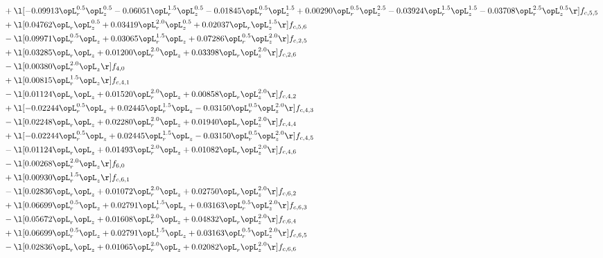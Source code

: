 \begin{alignat}{2}
& + \l[  -0.09913 \opL_r^{0.5} \opL_z^{0.5}   -0.06051 \opL_r^{1.5} \opL_z^{0.5}   -0.01845 \opL_r^{0.5} \opL_z^{1.5} +  0.00290 \opL_r^{0.5} \opL_z^{2.5}   -0.03924 \opL_r^{1.5} \opL_z^{1.5}   -0.03708 \opL_r^{2.5} \opL_z^{0.5}  \r] f_{c,5,5} \nonumber \\ 
& + \l[  0.04762 \opL_r \opL_z^{0.5} +  0.03419 \opL_r^{2.0} \opL_z^{0.5} +  0.02037 \opL_r \opL_z^{1.5}  \r] f_{c,5,6} \nonumber \\ 
& - \l[  0.09971 \opL_r^{0.5} \opL_z +  0.03065 \opL_r^{1.5} \opL_z +  0.07286 \opL_r^{0.5} \opL_z^{2.0}  \r] f_{c,2,5} \nonumber \\ 
& + \l[  0.03285 \opL_r \opL_z +  0.01200 \opL_r^{2.0} \opL_z +  0.03398 \opL_r \opL_z^{2.0}  \r] f_{c,2,6} \nonumber \\ 
& - \l[  0.00380 \opL_r^{2.0} \opL_z  \r] f_{4,0} \nonumber \\ 
& + \l[  0.00815 \opL_r^{1.5} \opL_z  \r] f_{c,4,1} \nonumber \\ 
& - \l[  0.01124 \opL_r \opL_z +  0.01520 \opL_r^{2.0} \opL_z +  0.00858 \opL_r \opL_z^{2.0}  \r] f_{c,4,2} \nonumber \\ 
& + \l[  -0.02244 \opL_r^{0.5} \opL_z +  0.02445 \opL_r^{1.5} \opL_z   -0.03150 \opL_r^{0.5} \opL_z^{2.0}  \r] f_{c,4,3} \nonumber \\ 
& - \l[  0.02248 \opL_r \opL_z +  0.02280 \opL_r^{2.0} \opL_z +  0.01940 \opL_r \opL_z^{2.0}  \r] f_{c,4,4} \nonumber \\ 
& + \l[  -0.02244 \opL_r^{0.5} \opL_z +  0.02445 \opL_r^{1.5} \opL_z   -0.03150 \opL_r^{0.5} \opL_z^{2.0}  \r] f_{c,4,5} \nonumber \\ 
& - \l[  0.01124 \opL_r \opL_z +  0.01493 \opL_r^{2.0} \opL_z +  0.01082 \opL_r \opL_z^{2.0}  \r] f_{c,4,6} \nonumber \\ 
& - \l[  0.00268 \opL_r^{2.0} \opL_z  \r] f_{6,0} \nonumber \\ 
& + \l[  0.00930 \opL_r^{1.5} \opL_z  \r] f_{c,6,1} \nonumber \\ 
& - \l[  0.02836 \opL_r \opL_z +  0.01072 \opL_r^{2.0} \opL_z +  0.02750 \opL_r \opL_z^{2.0}  \r] f_{c,6,2} \nonumber \\ 
& + \l[  0.06699 \opL_r^{0.5} \opL_z +  0.02791 \opL_r^{1.5} \opL_z +  0.03163 \opL_r^{0.5} \opL_z^{2.0}  \r] f_{c,6,3} \nonumber \\ 
& - \l[  0.05672 \opL_r \opL_z +  0.01608 \opL_r^{2.0} \opL_z +  0.04832 \opL_r \opL_z^{2.0}  \r] f_{c,6,4} \nonumber \\ 
& + \l[  0.06699 \opL_r^{0.5} \opL_z +  0.02791 \opL_r^{1.5} \opL_z +  0.03163 \opL_r^{0.5} \opL_z^{2.0}  \r] f_{c,6,5} \nonumber \\ 
& - \l[  0.02836 \opL_r \opL_z +  0.01065 \opL_r^{2.0} \opL_z +  0.02082 \opL_r \opL_z^{2.0}  \r] f_{c,6,6} \nonumber \\ 
\end{alignat} 


